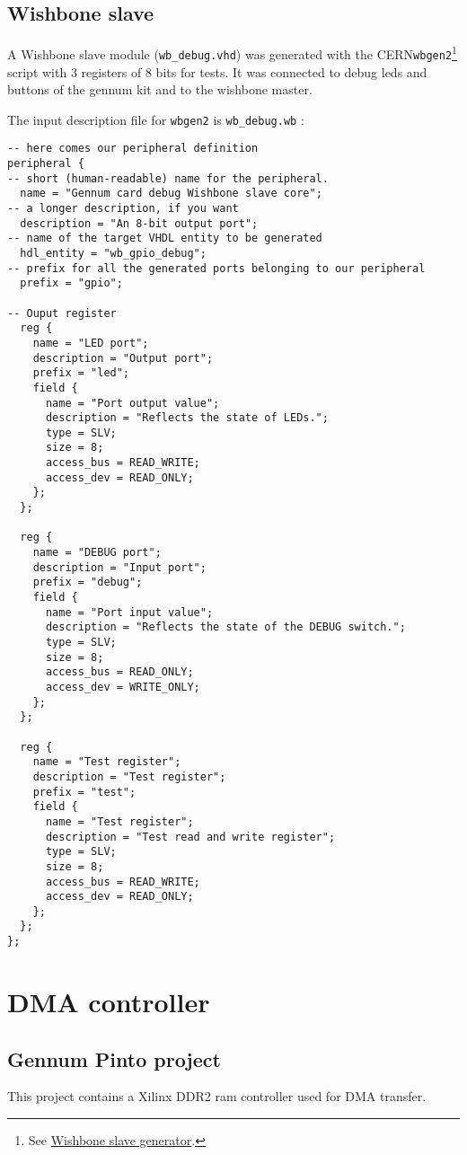 \documentclass[10pt,a4paper]{cerndoc}
\begin{document}
\clearpage   
  \subsection{Wishbone slave}  
A Wishbone slave module (\verb+wb_debug.vhd+) was generated with the CERN\verb+wbgen2+\footnote{See \href{http://www.ohwr.org/projects/wishbone-gen}{Wishbone slave generator}.} script with 3 registers of 8 bits for tests.
It was connected to debug leds and buttons of the gennum kit and to the wishbone master.   

The input description file for \verb+wbgen2+ is \verb+wb_debug.wb+ :
\begin{lstlisting}
-- here comes our peripheral definition
peripheral {
-- short (human-readable) name for the peripheral.
  name = "Gennum card debug Wishbone slave core";
-- a longer description, if you want
  description = "An 8-bit output port";
-- name of the target VHDL entity to be generated
  hdl_entity = "wb_gpio_debug";
-- prefix for all the generated ports belonging to our peripheral
  prefix = "gpio";

-- Ouput register
  reg {
    name = "LED port";
    description = "Output port";
    prefix = "led";
    field {
      name = "Port output value";
      description = "Reflects the state of LEDs.";
      type = SLV;
      size = 8;
      access_bus = READ_WRITE;
      access_dev = READ_ONLY;
    };
  };
		
  reg {
    name = "DEBUG port";
    description = "Input port";
    prefix = "debug";
    field {
      name = "Port input value";
      description = "Reflects the state of the DEBUG switch.";
      type = SLV;
      size = 8;
      access_bus = READ_ONLY;
      access_dev = WRITE_ONLY;
    };
  };
		
  reg {
    name = "Test register";
    description = "Test register";	
    prefix = "test";
    field {
      name = "Test register";
      description = "Test read and write register";
      type = SLV;
      size = 8;
      access_bus = READ_WRITE;
      access_dev = READ_ONLY;
    };
  };
};   
\end{lstlisting}   
   
\section{DMA controller}
  \subsection{Gennum Pinto project}
This project contains a Xilinx DDR2 ram controller used for DMA transfer.
\end{document}
